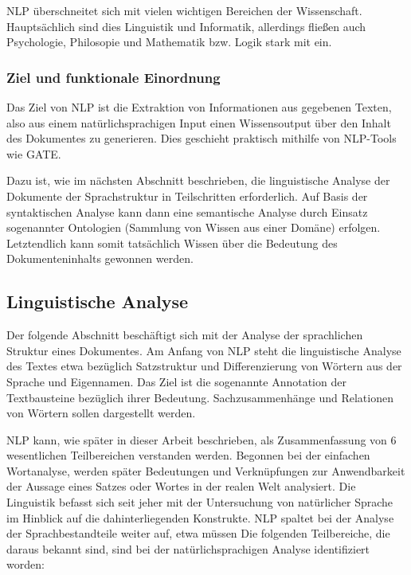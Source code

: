 \documentclass[12pt]{article}
\begin{document}
NLP überschneitet sich mit vielen wichtigen Bereichen der Wissenschaft. Hauptsächlich sind dies Linguistik und Informatik, allerdings fließen auch Psychologie, Philosopie und Mathematik bzw. Logik stark mit ein. 

\subsubsection{Ziel und funktionale Einordnung}
Das Ziel von NLP ist die Extraktion von Informationen aus gegebenen Texten, also aus einem natürlichsprachigen Input einen Wissensoutput über den Inhalt des Dokumentes zu generieren. Dies geschieht praktisch mithilfe von NLP-Tools wie GATE.

Dazu ist, wie im nächsten Abschnitt beschrieben, die linguistische Analyse der Dokumente der Sprachstruktur in Teilschritten erforderlich. Auf Basis der syntaktischen Analyse kann dann eine semantische Analyse durch Einsatz sogenannter Ontologien (Sammlung von Wissen aus einer Domäne) erfolgen. Letztendlich kann somit tatsächlich Wissen über die Bedeutung des Dokumenteninhalts gewonnen werden.

\subsection{Linguistische Analyse}
Der folgende Abschnitt beschäftigt sich mit der Analyse der sprachlichen Struktur eines Dokumentes. Am Anfang von NLP steht die linguistische Analyse des Textes etwa bezüglich Satzstruktur und Differenzierung von Wörtern aus der Sprache und Eigennamen. Das Ziel ist die sogenannte Annotation der Textbausteine bezüglich ihrer Bedeutung. Sachzusammenhänge und Relationen von Wörtern sollen dargestellt werden.

NLP kann, wie später in dieser Arbeit beschrieben, als Zusammenfassung von 6 wesentlichen Teilbereichen verstanden werden. Begonnen bei der einfachen Wortanalyse, werden später Bedeutungen und Verknüpfungen zur Anwendbarkeit der Aussage eines Satzes oder Wortes in der realen Welt analysiert. Die Linguistik befasst sich seit jeher mit der Untersuchung von natürlicher Sprache im Hinblick auf die dahinterliegenden Konstrukte. NLP spaltet bei der Analyse der Sprachbestandteile weiter auf, etwa müssen Die folgenden Teilbereiche, die daraus bekannt sind, sind bei der natürlichsprachigen Analyse identifiziert worden:
\end{document}
